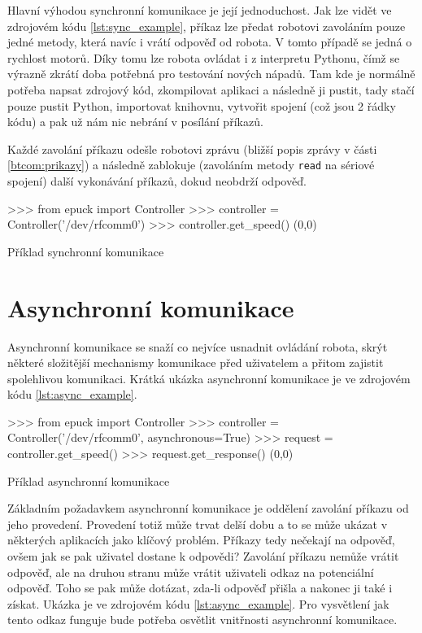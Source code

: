 \documentclass[12pt,notitlepage]{report}
\begin{document}
    Hlavní výhodou synchronní komunikace je její jednoduchost. Jak lze vidět
    ve zdrojovém kódu \ref{lst:sync_example}, příkaz lze předat robotovi
    zavoláním pouze jedné metody, která navíc i vrátí odpověď od robota. V
    tomto případě se jedná o rychlost motorů. Díky tomu lze robota ovládat i z
    interpretu Pythonu, čímž se výrazně zkrátí doba potřebná pro testování
    nových nápadů. Tam kde je normálně potřeba napsat zdrojový kód, zkompilovat
    aplikaci a následně ji pustit, tady stačí pouze pustit Python, importovat
    knihovnu, vytvořit spojení (což jsou 2 řádky kódu) a pak už nám nic nebrání
    v posílání příkazů.

    Každé zavolání příkazu odešle robotovi zprávu (bližší popis zprávy v části
    \ref{btcom:prikazy}) a následně zablokuje (zavoláním metody {\tt read} na
    sériové spojení) další vykonávání příkazů, dokud neobdrží odpověď.

    \begin{listing}[h]
    \begin{pyc}
>>> from epuck import Controller
>>> controller = Controller('/dev/rfcomm0')
>>> controller.get_speed()
(0,0)
    \end{pyc}
    \caption{Příklad synchronní komunikace}
    \label{lst:sync_example}
    \end{listing}

    \section{Asynchronní komunikace}
    \label{async-impl}

    Asynchronní komunikace se snaží co nejvíce usnadnit ovládání robota, skrýt
    některé složitější mechanismy komunikace před uživatelem a přitom zajistit
    spolehlivou komunikaci. Krátká ukázka asynchronní komunikace je ve
    zdrojovém kódu \ref{lst:async_example}.

    \begin{listing}[h]
    \begin{pyc}
>>> from epuck import Controller
>>> controller = Controller('/dev/rfcomm0', asynchronous=True)
>>> request = controller.get_speed()
>>> request.get_response()
(0,0)
    \end{pyc}
    \caption{Příklad asynchronní komunikace}
    \label{lst:async_example}
    \end{listing}

    Základním požadavkem asynchronní komunikace je oddělení zavolání příkazu od
    jeho provedení. Provedení totiž může trvat delší dobu a to se může ukázat v
    některých aplikacích jako klíčový problém. Příkazy tedy nečekají na
    odpověď, ovšem jak se pak uživatel dostane k odpovědi? Zavolání příkazu
    nemůže vrátit odpověď, ale na druhou stranu může vrátit uživateli odkaz na
    potenciální odpověď. Toho se pak může dotázat, zda-li odpověď přišla a
    nakonec ji také i získat. Ukázka je ve zdrojovém kódu
    \ref{lst:async_example}. Pro vysvětlení jak tento odkaz funguje bude
    potřeba osvětlit vnitřnosti asynchronní komunikace.
\end{document}

